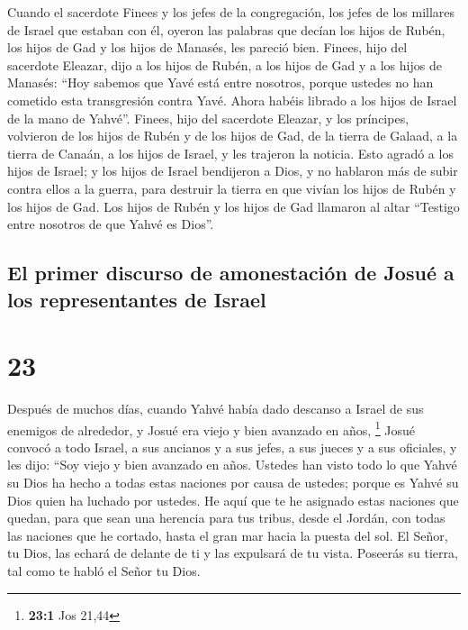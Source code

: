  Cuando el sacerdote Finees y los jefes de la
congregación, los jefes de los millares de Israel que estaban con él,
oyeron las palabras que decían los hijos de Rubén, los hijos de Gad y
los hijos de Manasés, les pareció bien.  Finees, hijo del
sacerdote Eleazar, dijo a los hijos de Rubén, a los hijos de Gad y a los
hijos de Manasés: ``Hoy sabemos que Yavé está entre nosotros, porque
ustedes no han cometido esta transgresión contra Yavé. Ahora habéis
librado a los hijos de Israel de la mano de Yahvé''. 
Finees, hijo del sacerdote Eleazar, y los príncipes, volvieron de los
hijos de Rubén y de los hijos de Gad, de la tierra de Galaad, a la
tierra de Canaán, a los hijos de Israel, y les trajeron la noticia.
 Esto agradó a los hijos de Israel; y los hijos de Israel
bendijeron a Dios, y no hablaron más de subir contra ellos a la guerra,
para destruir la tierra en que vivían los hijos de Rubén y los hijos de
Gad.  Los hijos de Rubén y los hijos de Gad llamaron al
altar ``Testigo entre nosotros de que Yahvé es Dios''.

\hypertarget{el-primer-discurso-de-amonestaciuxf3n-de-josuuxe9-a-los-representantes-de-israel}{%
\subsection{El primer discurso de amonestación de Josué a los
representantes de
Israel}\label{el-primer-discurso-de-amonestaciuxf3n-de-josuuxe9-a-los-representantes-de-israel}}

\hypertarget{section-22}{%
\section{23}\label{section-22}}

 Después de muchos días, cuando Yahvé había dado descanso
a Israel de sus enemigos de alrededor, y Josué era viejo y bien avanzado
en años, \footnote{\textbf{23:1} Jos 21,44}  Josué convocó
a todo Israel, a sus ancianos y a sus jefes, a sus jueces y a sus
oficiales, y les dijo: ``Soy viejo y bien avanzado en años.
 Ustedes han visto todo lo que Yahvé su Dios ha hecho a
todas estas naciones por causa de ustedes; porque es Yahvé su Dios quien
ha luchado por ustedes.  He aquí que te he asignado estas
naciones que quedan, para que sean una herencia para tus tribus, desde
el Jordán, con todas las naciones que he cortado, hasta el gran mar
hacia la puesta del sol.  El Señor, tu Dios, las echará de
delante de ti y las expulsará de tu vista. Poseerás su tierra, tal como
te habló el Señor tu Dios.

